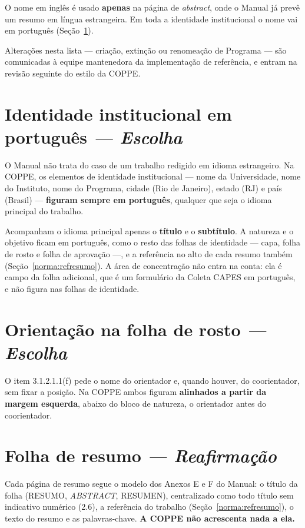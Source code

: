 \documentclass[a4paper,11pt]{article}
\newcommand\tipo[1]{\normalfont\textit{--- #1}}
\begin{document}
O nome em inglês é usado \textbf{apenas} na página de \textit{abstract}, onde o
Manual já prevê um resumo em língua estrangeira. Em toda a identidade
institucional o nome vai em português (Seção~\ref{norma:identidade}).

Alterações nesta lista --- criação, extinção ou renomeação de Programa --- são
comunicadas à equipe mantenedora da implementação de referência, e entram na
revisão seguinte do estilo da COPPE.

\section{Identidade institucional em português \tipo{Escolha}}
\label{norma:identidade}

O Manual não trata do caso de um trabalho redigido em idioma estrangeiro. Na
COPPE, os elementos de identidade institucional --- nome da Universidade, nome
do Instituto, nome do Programa, cidade (Rio de Janeiro), estado (RJ) e país
(Brasil) --- \textbf{figuram sempre em português}, qualquer que seja o idioma
principal do trabalho.

Acompanham o idioma principal apenas o \textbf{título} e o \textbf{subtítulo}.
A natureza e o objetivo ficam em português, como o resto das folhas de
identidade --- capa, folha de rosto e folha de aprovação ---, e a referência no
alto de cada resumo também (Seção~\ref{norma:refresumo}). A área de concentração
não entra na conta: ela é campo da folha adicional, que é um formulário da
Coleta CAPES em português, e não figura nas folhas de identidade.

\section{Orientação na folha de rosto \tipo{Escolha}}

O item 3.1.2.1.1(f) pede o nome do orientador e, quando houver, do
coorientador, sem fixar a posição. Na COPPE ambos figuram \textbf{alinhados a
partir da margem esquerda}, abaixo do bloco de natureza, o orientador antes do
coorientador.

\section{Folha de resumo \tipo{Reafirmação}}

Cada página de resumo segue o modelo dos Anexos E e F do Manual: o título da
folha (RESUMO, \textit{ABSTRACT}, RESUMEN), centralizado como todo título sem
indicativo numérico (2.6), a referência do trabalho
(Seção~\ref{norma:refresumo}), o texto do resumo e as palavras-chave.
\textbf{A COPPE não acrescenta nada a ela.}
\end{document}

